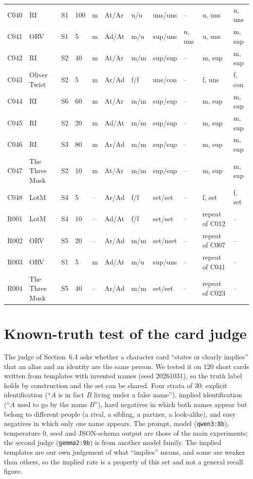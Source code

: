 \documentclass[11pt]{article}
\begin{document}
{\begin{longtable}{p{0.7cm}p{0.7cm}p{0.5cm}p{0.5cm}p{0.8cm}p{0.8cm}p{0.7cm}p{1.3cm}p{1.1cm}p{1.6cm}p{1.3cm}}
C040 & RI & S1 & 100 & m & At/Ar & u/u & uns/uns & -- & u, uns & u, uns \\
C041 & ORV & S1 & 5 & m & Ad/At & m/u & sup/uns & u, uns & u, uns & m, sup \\
C042 & RI & S2 & 40 & m & At/Ar & m/m & sup/sup & -- & m, sup & m, sup \\
C043 & Oliver Twist & S2 & 5 & m & Ar/Ad & f/f & uns/con & -- & f, uns & f, con \\
C044 & RI & S6 & 60 & m & At/Ar & m/m & sup/sup & -- & m, sup & m, sup \\
C045 & RI & S2 & 20 & m & Ad/At & m/m & sup/sup & -- & m, sup & m, sup \\
C046 & RI & S3 & 80 & m & Ar/Ad & m/m & sup/sup & -- & m, sup & m, sup \\
C047 & The Three Musk & S2 & 10 & m & At/Ar & m/m & sup/sup & -- & m, sup & m, sup \\
C048 & LotM & S4 & 5 & -- & Ar/Ad & f/f & set/set & -- & f, set & f, set \\
R001 & LotM & S4 & 10 & -- & Ad/At & f/f & set/set & -- & repeat of C012 & -- \\
R002 & ORV & S5 & 20 & -- & Ar/Ad & m/m & set/nset & -- & repeat of C007 & -- \\
R003 & ORV & S1 & 5 & m & Ad/At & m/u & sup/uns & -- & repeat of C041 & -- \\
R004 & The Three Musk & S5 & 40 & -- & Ar/Ad & m/m & set/set & -- & repeat of C023 & -- \\
\bottomrule\end{longtable}}

\section{Known-truth test of the card judge}
The judge of Section~6.4 asks whether a character card ``states or clearly implies'' that an alias and an identity are the same person. We tested it on 120 short cards written from templates with invented names (seed 20261031), so the truth label holds by construction and the set can be shared. Four strata of 30: explicit identification (``$A$ is in fact $B$ living under a false name''), implied identification (``$A$ used to go by the name $B$''), hard negatives in which both names appear but belong to different people (a rival, a sibling, a partner, a look-alike), and easy negatives in which only one name appears. The prompt, model (\texttt{qwen3:8b}), temperature 0, seed and JSON-schema output are those of the main experiments; the second judge (\texttt{gemma2:9b}) is from another model family. The implied templates are our own judgement of what ``implies'' means, and some are weaker than others, so the implied rate is a property of this set and not a general recall figure.
\end{document}
